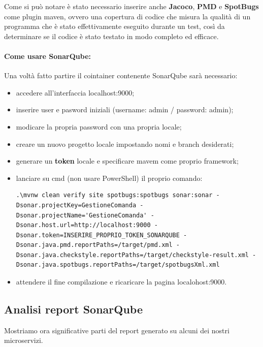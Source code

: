 Come si può notare è stato necessario inserire anche \textbf{Jacoco}\cite{Jacoco}, \textbf{PMD}\cite{PMD} e \textbf{SpotBugs}\cites{spotbugs} come plugin maven, ovvero una copertura di codice che misura la qualità di un programma che è stato effettivamente eseguito durante un test, così da determinare se il codice è stato testato in modo completo ed efficace.

\paragraph{Come usare SonarQube:}

Una voltà fatto partire il cointainer contenente SonarQube sarà necessario:

\begin{itemize}
 \item accedere all'interfaccia localhost:9000;
 \item inserire user e pasword iniziali (username: admin / password: admin);
 \item modicare la propria password con una propria locale;
 \item creare un nuovo progetto locale impostando nomi e branch desiderati;
 \item generare un \textbf{token} locale e specificare mavem come proprio framework;
 \item lanciare su cmd (non usare PowerShell) il proprio comando:
\begin{lstlisting}[style=terminal, 
	caption={Avvio sonarqube}]
    .\mvnw clean verify site spotbugs:spotbugs sonar:sonar -Dsonar.projectKey=GestioneComanda -Dsonar.projectName='GestioneComanda' -Dsonar.host.url=http://localhost:9000 -Dsonar.token=INSERIRE_PROPRIO_TOKEN_SONARQUBE -Dsonar.java.pmd.reportPaths=/target/pmd.xml -Dsonar.java.checkstyle.reportPaths=/target/checkstyle-result.xml -Dsonar.java.spotbugs.reportPaths=/target/spotbugsXml.xml
\end{lstlisting}
\item attendere il fine compilazione e ricaricare la pagina localohost:9000.
\end{itemize}

\subsection{Analisi report SonarQube}
Mostriamo ora significative parti del report generato su alcuni dei nostri microservizi.

